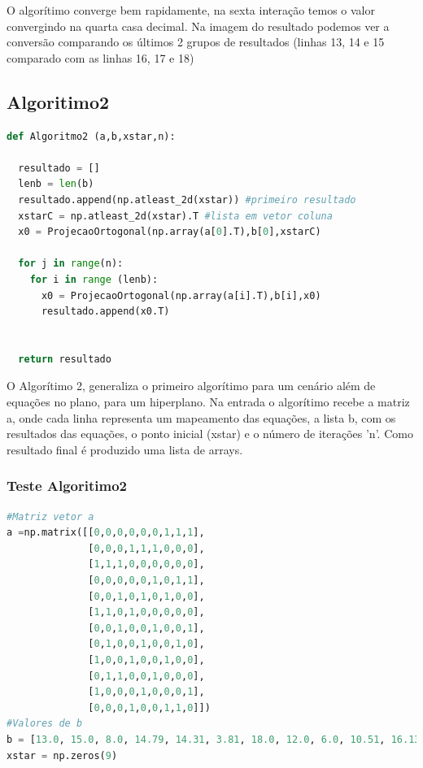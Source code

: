 \documentclass[a4paper, 12pt]{article}
\begin{document}
O algorítimo converge bem rapidamente, na sexta interação temos o valor convergindo na quarta casa decimal. Na imagem do resultado podemos ver a conversão comparando os últimos 2 grupos de resultados (linhas 13, 14 e 15 comparado com as linhas 16, 17 e 18)

\subsection{Algoritimo2}

\begin{lstlisting}[language=Python, caption=Algorítimo2, label=Algoritimo2]
def Algoritmo2 (a,b,xstar,n):
  
  resultado = []
  lenb = len(b)
  resultado.append(np.atleast_2d(xstar)) #primeiro resultado
  xstarC = np.atleast_2d(xstar).T #lista em vetor coluna
  x0 = ProjecaoOrtogonal(np.array(a[0].T),b[0],xstarC)

  for j in range(n):
    for i in range (lenb):
      x0 = ProjecaoOrtogonal(np.array(a[i].T),b[i],x0)
      resultado.append(x0.T)
   
  
  return resultado
\end{lstlisting}

O Algorítimo 2, generaliza o primeiro algorítimo para um cenário além de equações no plano, para um hiperplano. Na entrada o algorítimo recebe a matriz a, onde cada linha representa um mapeamento das equações, a lista b, com os resultados das equações, o ponto inicial (xstar) e o número de iterações 'n'. Como resultado final é produzido uma lista de arrays.

\subsubsection{Teste Algoritimo2}

\begin{lstlisting}[language=Python, caption=entradas, label=Algoritimo2_entradas]
#Matriz vetor a
a =np.matrix([[0,0,0,0,0,0,1,1,1],
              [0,0,0,1,1,1,0,0,0],
              [1,1,1,0,0,0,0,0,0],
              [0,0,0,0,0,1,0,1,1],
              [0,0,1,0,1,0,1,0,0],
              [1,1,0,1,0,0,0,0,0],
              [0,0,1,0,0,1,0,0,1],
              [0,1,0,0,1,0,0,1,0],
              [1,0,0,1,0,0,1,0,0],
              [0,1,1,0,0,1,0,0,0],
              [1,0,0,0,1,0,0,0,1],
              [0,0,0,1,0,0,1,1,0]])
#Valores de b
b = [13.0, 15.0, 8.0, 14.79, 14.31, 3.81, 18.0, 12.0, 6.0, 10.51, 16.13, 7.04]
xstar = np.zeros(9)
\end{lstlisting}
\end{document}
